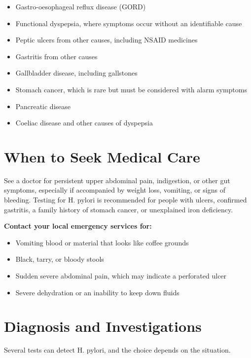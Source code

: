 \begin{itemize}
    \item Gastro-oesophageal reflux disease (GORD)
    \item Functional dyspepsia, where symptoms occur without an identifiable cause
    \item Peptic ulcers from other causes, including NSAID medicines
    \item Gastritis from other causes
    \item Gallbladder disease, including gallstones
    \item Stomach cancer, which is rare but must be considered with alarm symptoms
    \item Pancreatic disease
    \item Coeliac disease and other causes of dyspepsia
\end{itemize}

\section*{When to Seek Medical Care}
See a doctor for persistent upper abdominal pain, indigestion, or other gut symptoms, especially if accompanied by weight loss, vomiting, or signs of bleeding. Testing for H. pylori is recommended for people with ulcers, confirmed gastritis, a family history of stomach cancer, or unexplained iron deficiency.

\textbf{Contact your local emergency services for:}
\begin{itemize}
    \item Vomiting blood or material that looks like coffee grounds
    \item Black, tarry, or bloody stools
    \item Sudden severe abdominal pain, which may indicate a perforated ulcer
    \item Severe dehydration or an inability to keep down fluids
\end{itemize}

\section*{Diagnosis and Investigations}
Several tests can detect H. pylori, and the choice depends on the situation.

